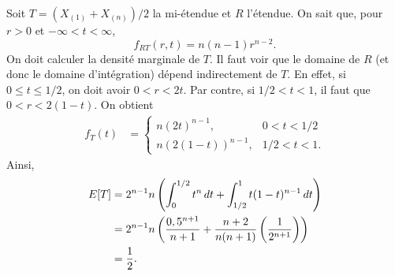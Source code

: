 \begin{solution}{1.21}
    Soit $T = (X_{(1)} + X_{(n)})/2$ la mi-étendue et $R$ l'étendue.
    On sait que, pour $r > 0$ et $-\infty < t < \infty$,
    \begin{displaymath}
      f_{RT}(r, t) = n(n-1)r^{n - 2}.
    \end{displaymath}
    On doit calculer la densité marginale de $T$. Il faut voir que le
    domaine de $R$ (et donc le domaine d'intégration) dépend
    indirectement de $T$. En effet, si $0 \leq t \leq 1/2$, on doit
    avoir $0 < r < 2t$. Par contre, si $1/2 < t < 1$, il faut que $0 <
    r < 2(1-t)$. On obtient
    \begin{align*}
      f_T(t) &=
      \begin{cases}
        n(2t)^{n-1}, & 0 < t < 1/2 \\
        n(2(1 - t))^{n - 1}, & 1/2 < t < 1.
      \end{cases}
    \end{align*}
    Ainsi,
    \begin{align*}
      E [ T ] &= 2^{n - 1} n
      \left(
        \int_0^{1/2}t^n\,dt +
        \int_{1/2}^1 t (1 - t)^{n - 1}\, dt
      \right) \\
      &= 2^{n-1}n
      \left(
        \frac{0,5^{n+1}}{n+1} +
        \frac{n+2}{n(n + 1)}
        \left(
          \frac{1}{2^{n+1}}
        \right)
      \right) \\
      &= \frac{1}{2}.
    \end{align*}
  
\end{solution}
